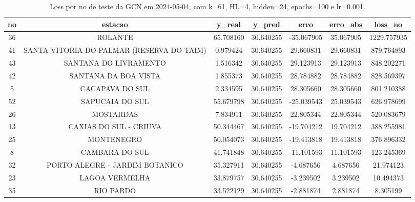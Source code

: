 \begin{table}[h]
\centering
\caption{Loss por no de teste da GCN em 2024-05-04, com k=61, HL=4, hidden=24, epochs=100 e lr=0.001.}
\label{tab:gcn_loss_k61_hl4_h24_e100_d20240504}
\begin{tabular}{ccccccc}
\toprule
no & estacao & y\_real & y\_pred & erro & erro\_abs & loss\_no \\
\midrule
36 & ROLANTE & 65.708160 & 30.640255 & -35.067905 & 35.067905 & 1229.757935 \\
41 & SANTA VITORIA DO PALMAR (RESERVA DO TAIM) & 0.979424 & 30.640255 & 29.660831 & 29.660831 & 879.764893 \\
43 & SANTANA DO LIVRAMENTO & 1.516342 & 30.640255 & 29.123913 & 29.123913 & 848.202271 \\
42 & SANTANA DA BOA VISTA & 1.855373 & 30.640255 & 28.784882 & 28.784882 & 828.569397 \\
5 & CACAPAVA DO SUL & 2.334595 & 30.640255 & 28.305660 & 28.305660 & 801.210388 \\
52 & SAPUCAIA DO SUL & 55.679798 & 30.640255 & -25.039543 & 25.039543 & 626.978699 \\
26 & MOSTARDAS & 7.834911 & 30.640255 & 22.805344 & 22.805344 & 520.083679 \\
13 & CAXIAS DO SUL - CRIUVA & 50.344467 & 30.640255 & -19.704212 & 19.704212 & 388.255981 \\
25 & MONTENEGRO & 50.054073 & 30.640255 & -19.413818 & 19.413818 & 376.896332 \\
8 & CAMBARA DO SUL & 41.741848 & 30.640255 & -11.101593 & 11.101593 & 123.245369 \\
32 & PORTO ALEGRE - JARDIM BOTANICO & 35.327911 & 30.640255 & -4.687656 & 4.687656 & 21.974123 \\
23 & LAGOA VERMELHA & 33.879757 & 30.640255 & -3.239502 & 3.239502 & 10.494373 \\
35 & RIO PARDO & 33.522129 & 30.640255 & -2.881874 & 2.881874 & 8.305199 \\
\bottomrule
\end{tabular}
\end{table}
